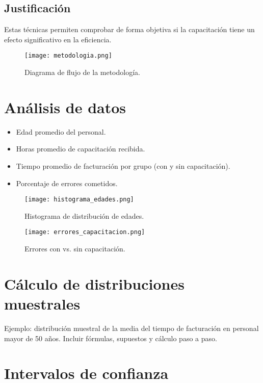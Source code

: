 \documentclass[12pt,a4paper]{report}
\begin{document}
\section*{Justificación}
Estas técnicas permiten comprobar de forma objetiva si la capacitación tiene un efecto significativo en la eficiencia.

\begin{figure}[H]
    \centering
    \texttt{[image: metodologia.png]}
    \caption{Diagrama de flujo de la metodología.}
\end{figure}

\chapter{Análisis de datos}
\begin{itemize}
    \item Edad promedio del personal.
    \item Horas promedio de capacitación recibida.
    \item Tiempo promedio de facturación por grupo (con y sin capacitación).
    \item Porcentaje de errores cometidos.
\end{itemize}

\begin{figure}[H]
    \centering
    \texttt{[image: histograma\_edades.png]}
    \caption{Histograma de distribución de edades.}
\end{figure}

\begin{figure}[H]
    \centering
    \texttt{[image: errores\_capacitacion.png]}
    \caption{Errores con vs. sin capacitación.}
\end{figure}

\chapter{Cálculo de distribuciones muestrales}

Ejemplo: distribución muestral de la media del tiempo de facturación en personal mayor de 50 años. Incluir fórmulas, supuestos y cálculo paso a paso.

\chapter{Intervalos de confianza}
\end{document}
